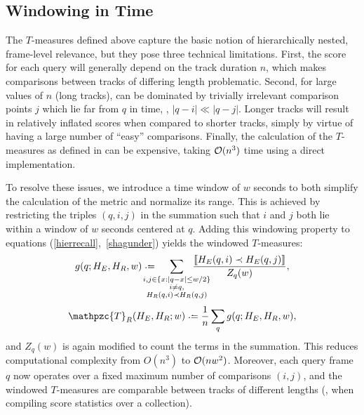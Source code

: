 \documentclass{article}
\def\shag{\ensuremath{\mathpzc{T}}}
\begin{document}

\subsection{Windowing in Time}
\label{sec:window}

The $T$-measures defined above capture the basic notion of hierarchically nested, frame-level relevance, but
they pose three technical limitations.
First, the score for each query will generally depend on the track duration $n$, which makes comparisons between tracks of differing length problematic.  
Second, for large values of $n$ (long tracks),  can be dominated by trivially irrelevant comparison points $j$ which lie far from $q$ in time, \ie, $|q-i| \ll |q-j|$.
Longer tracks will result in relatively inflated scores when compared to shorter tracks, simply by virtue of having a large number of ``easy'' comparisons.
Finally, the calculation of the $T$-measures as defined in  can be expensive, taking
$\mathcal{O}(n^3)$ time using a direct implementation.

To resolve these issues, we introduce a time window of $w$ seconds to both simplify the 
calculation of the metric and normalize its range.  This is achieved by
restricting the triples $(q,i,j)$ in the summation such that $i$ and $j$ both lie within
a window of $w$ seconds centered at $q$.
Adding this windowing property to equations (\ref{hierrecall},~\ref{shagunder}) yields the windowed $T$-measures:
\begin{equation}
    g(q ; H_E, H_R, w) \defeq \hspace{-1.5em} \sum_{\substack{
        i, j \in \{x : |q-x| \leq w/2\}\\ 
  i \neq q,\\
  H_R(q, i) \prec H_R(q, j) }}
  \hspace{-2em} \frac{\ind{H_E(q, i) \prec H_E(q,
  j)}}{Z_q(w)},\label{windowrecall}
\end{equation}
\begin{equation}
\shag_R(H_E, H_R ; w) \defeq \frac{1}{n} \sum_q g(q ; H_E, H_R, w),
\end{equation}
and $Z_q(w)$ is again modified to count the terms in the summation.
This reduces computational complexity from $O(n^3)$ to $\mathcal{O}(nw^2)$.
Moreover, each query frame $q$ now operates over a fixed maximum number of comparisons
$(i, j)$, and the windowed $T$-measures are comparable between tracks of different lengths (\eg, when
compiling score statistics over a collection).
\end{document}
